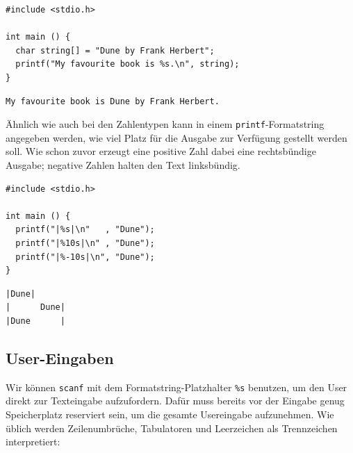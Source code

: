 \begin{codebox}
\begin{verbatim}
#include <stdio.h>

int main () {
  char string[] = "Dune by Frank Herbert";
  printf("My favourite book is %s.\n", string);
}
\end{verbatim}
\end{codebox}

\begin{cmdbox}
\begin{verbatim}
My favourite book is Dune by Frank Herbert.
\end{verbatim}
\end{cmdbox}

Ähnlich wie auch bei den Zahlentypen kann in einem \texttt{printf}-Formatstring angegeben werden, wie viel Platz für die Ausgabe zur Verfügung gestellt werden soll. Wie schon zuvor erzeugt eine positive Zahl dabei eine rechtsbündige Ausgabe; negative Zahlen halten den Text linksbündig.

\begin{codebox}
\begin{verbatim}
#include <stdio.h>

int main () {
  printf("|%s|\n"   , "Dune");
  printf("|%10s|\n" , "Dune");
  printf("|%-10s|\n", "Dune");
}
\end{verbatim}
\end{codebox}

\begin{cmdbox}
\begin{verbatim}
|Dune|
|      Dune|
|Dune      |
\end{verbatim}
\end{cmdbox}

\subsection{User-Eingaben} \label{sec:strInput}
Wir können \texttt{scanf} mit dem Formatstring-Platzhalter \texttt{\%s} benutzen, um den User direkt zur Texteingabe aufzufordern. Dafür muss bereits vor der Eingabe genug Speicherplatz reserviert sein, um die gesamte Usereingabe aufzunehmen. Wie üblich werden Zeilenumbrüche, Tabulatoren und Leerzeichen als Trennzeichen interpretiert:

